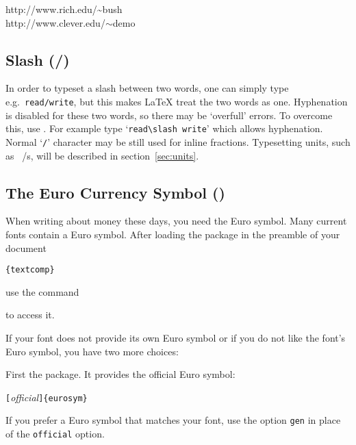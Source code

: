 \begin{example}
http://www.rich.edu/\~{}bush \\
http://www.clever.edu/$\sim$demo
\end{example}

\subsection{Slash (/)}
In order to typeset a slash between two words, one can simply type e.g.\
\texttt{read/write}, but this makes \LaTeX{} treat the two words as one.
Hyphenation is disabled for these two words, so there may be `overfull'
errors.  To overcome this, use \ci{slash}.  For example type
`\verb|read\slash write|' which allows hyphenation.  Normal `\texttt{/}'
character may be still used for inline fractions. Typesetting units,
such as \unit[per-mode = symbol]{\mebi\byte\per\s}, will be described in
section~\ref{sec:units}.

\subsection{The Euro Currency Symbol \texorpdfstring{(\officialeuro)}{}}

When writing about money these days, you need the Euro symbol. Many current
fonts contain a Euro symbol. After loading the \pai{textcomp} package in the preamble of your document
\begin{lscommand}
\verb|{textcomp}|
\end{lscommand}
use the command
\begin{lscommand}
\end{lscommand}
to access it.

If your font does not provide its own Euro symbol or if you do not like the
font's Euro symbol, you have two more choices:

First the \pai{eurosym} package. It provides the official Euro symbol:
\begin{lscommand}
\verb|[|\emph{official}\verb|]{eurosym}|
\end{lscommand}
If you prefer a Euro symbol that matches your font, use the option
\texttt{gen} in place of the \texttt{official} option.


